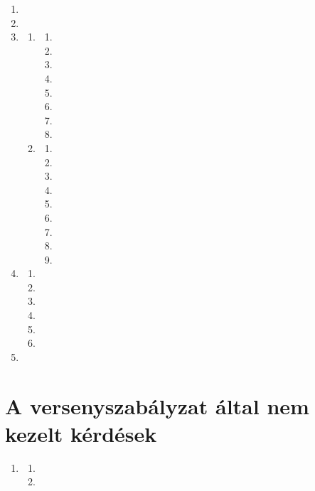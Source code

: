 \documentclass[]{report}
\begin{document}
\begin{enumerate}
\item

\item

\item

    \begin{enumerate}
    \item
    
        \begin{enumerate}
        \item
        
        \item
        
        \item
        
        \item
        
        \item
        
        \item
        
        \item
        
        \item
        
        \end{enumerate}
    \item
    
        \begin{enumerate}
        \item
        
        \item
        
        \item
        
        \item
        
        \item
        
        \item
        
        \item
        
        \item
        
        \item
        
        \end{enumerate}
    \end{enumerate}
\item

    \begin{enumerate}
    \item
    
    \item
    
    \item
    
    \item
    
    \item
    
    \item
    
    \end{enumerate}
\item

\end{enumerate}


\chapter{A versenyszabályzat által nem kezelt kérdések} 

\begin{enumerate}
\item

    \begin{enumerate}
    \item
    
    \item
    
    \end{enumerate}
\end{enumerate}
\end{document}
